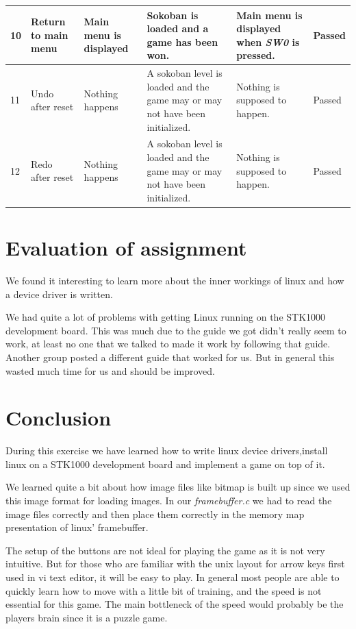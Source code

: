 \documentclass[a4paper,11pt]{article}
\begin{document}
\begin{center}
\begin{tabular}[pos]{|m{35pt}|m{45pt}|m{80pt}|m{90pt}|m{105pt}|m{40pt}|}
\hline 10 & Return to main menu & Main menu is displayed & Sokoban is loaded and a game has been won. & Main menu is displayed when \emph{SW0} is pressed.  & Passed \\

\hline 11 & Undo after reset & Nothing happens & A sokoban level is loaded and the game may or may not have been initialized. & Nothing is supposed to happen.  & Passed \\

\hline 12 & Redo after reset & Nothing happens & A sokoban level is loaded and the game may or may not have been initialized. & Nothing is supposed to happen.  & Passed \\

\hline 
\end{tabular} 
\end{center}

\newpage


\section{Evaluation of assignment}
We found it interesting to learn more about the inner workings of linux and how a device driver is written. 

We had quite a lot of problems with getting Linux running on the STK1000 development board. This was much due to the guide we got didn't really seem to work, at least no one that we talked to made it work by following that guide. Another group posted a different guide that worked for us. But in general this wasted much time for us and should be improved. 

\section{Conclusion}
During this exercise we have learned how to write linux device drivers,install linux on a STK1000 development board and implement a game on top of it. 





We learned quite a bit about how image files like bitmap is built up since we used this image format for loading images. In our \textit{framebuffer.c} we had to read the image files correctly and then place them correctly in the memory map presentation of linux' framebuffer. 


The setup of the buttons are not ideal for playing the game as it is not very intuitive. But for those who are familiar with the unix layout for arrow keys first used in vi text editor, it will be easy to play. In general most people are able to quickly learn how to move with a little bit of training, and the speed is not essential for this game. The main bottleneck of the speed would probably be the players brain since it is a puzzle game.
\end{document}
